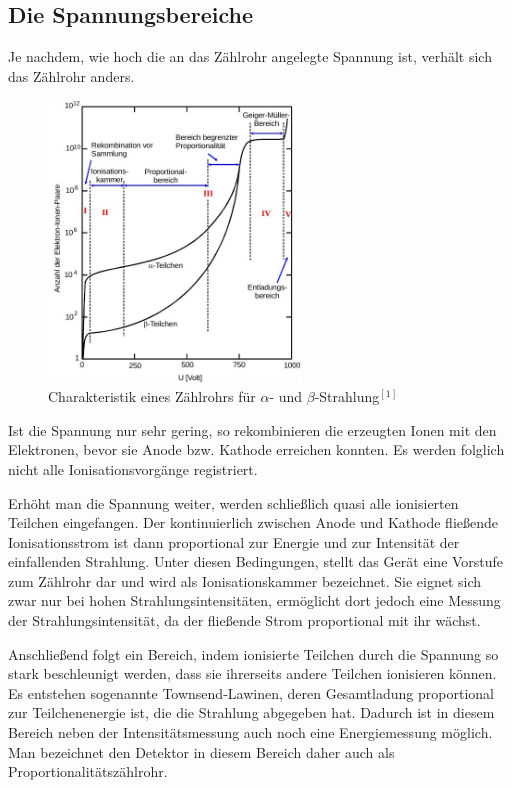 \subsection{Die Spannungsbereiche}
\label{sec_spannungsbereiche}
Je nachdem, wie hoch die an das Zählrohr angelegte Spannung ist, verhält sich das Zählrohr anders.

\begin{figure}[h]
\includegraphics[width=0.6\textwidth]{pics/charak.jpg}
\caption{Charakteristik eines Zählrohrs für $\alpha$- und $\beta$-Strahlung$^{[1]}$}
\end{figure}

Ist die Spannung nur sehr gering, so rekombinieren die erzeugten Ionen mit den Elektronen, bevor sie Anode bzw. Kathode erreichen konnten. Es werden folglich nicht alle Ionisationsvorgänge registriert.

Erhöht man die Spannung weiter, werden schließlich quasi alle ionisierten Teilchen eingefangen. Der kontinuierlich zwischen Anode und Kathode fließende Ionisationsstrom ist dann proportional zur Energie und zur Intensität der einfallenden Strahlung. Unter diesen Bedingungen, stellt das Gerät eine Vorstufe zum Zählrohr dar und wird als Ionisationskammer bezeichnet. Sie eignet sich zwar nur bei hohen Strahlungsintensitäten, ermöglicht dort jedoch eine Messung der Strahlungsintensität, da der fließende Strom proportional mit ihr wächst.

Anschließend folgt ein Bereich, indem ionisierte Teilchen durch die Spannung so stark beschleunigt werden, dass sie ihrerseits andere Teilchen ionisieren können. Es entstehen sogenannte Townsend-Lawinen, deren Gesamtladung proportional zur Teilchenenergie ist, die die Strahlung abgegeben hat. Dadurch ist in diesem Bereich neben der Intensitätsmessung auch noch eine Energiemessung möglich. Man bezeichnet den Detektor in diesem Bereich daher auch als Proportionalitätszählrohr.

